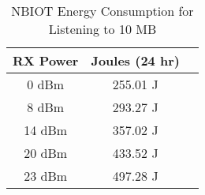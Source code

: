 \begin{table}[ht]
    \centering
    \small
    \begin{tabularx}{\columnwidth}{c c c}
    \toprule
    RX Power & Joules (24 hr) \\
    \midrule
    0 dBm & 255.01 J \\
    8 dBm & 293.27 J \\
    14 dBm & 357.02 J \\
    20 dBm & 433.52 J \\
    23 dBm & 497.28 J \\
    \bottomrule
    \end{tabularx}
    \caption{NBIOT Energy Consumption for Listening to 10 MB}
    \label{tab:nbiotrx}
\end{table}